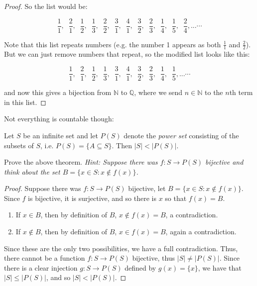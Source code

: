 \documentclass[11pt,dvipsnames]{book}
\numberwithin{equation}{section} %
\numberwithin{figure}{section} %
\numberwithin{table}{section} %
\begin{document}
\begin{proof}
So the list would be:

\[
\frac{1}{1}, \;\; \frac{2}{1}, \;\; \frac{1}{2}, \;\; \frac{1}{3}, \;\; \frac{2}{2}, \;\; \frac{3}{1}, \;\; \frac{4}{1}, \;\; \frac{3}{2}, \;\; \frac{2}{3}, \;\; \frac{1}{4}, \;\; \frac{1}{5}, \;\; \frac{2}{4},...\cdots \]

Note that this list repeats numbers (e.g. the number 1 appears as both $\frac{1}{1}$ and $\frac{2}{2}$). But we can just remove numbers that repeat, so the modified list looks like this:

\[
\frac{1}{1}, \;\; \frac{2}{1}, \;\; \frac{1}{2}, \;\; \frac{1}{3},  \;\; \frac{3}{1}, \;\; \frac{4}{1}, \;\; \frac{3}{2}, \;\; \frac{2}{3}, \;\; \frac{1}{4}, \;\; \frac{1}{5},...\cdots \]

and now this gives a bijection from $\mathbb{N}$ to $\mathbb{Q}$, where we send $n\in\mathbb{N}$ to the $n$th term in this list. 

\end{proof}

Not everything is countable though:

\begin{theorem}
Let $S$ be an infinite set and let $P(S)$ denote the {\it power set} consisting of the subsets of $S$, i.e. $P(S)= \{A\subseteq S\}$. Then $|S|<|P(S)|$. 
\end{theorem}

\begin{exercise}
Prove the above theorem. {\it Hint: Suppose there was $f:S\rightarrow P(S)$ bijective and think about the set $B=\{x\in S: x\not\in f(x)\}$.}
\end{exercise}

\begin{solution}
\begin{proof}
Suppose there was $f:S\rightarrow P(S)$ bijective, let $B=\{x\in S: x\not\in f(x)\}$. Since $f$ is bijective, it is surjective, and so there is $x$ so that $f(x)=B$. 
\begin{enumerate}
\item If $x\in B$, then by definition of $B$, $x\not\in f(x)=B$, a contradiction.
\item If $x\not\in B$, then by definition of $B$, $x\in f(x)=B$, again a contradiction.
\end{enumerate}
Since these are the only two possibilities, we have a full contradiction. Thus, there cannot be a function $f:S\rightarrow P(S)$ bijective, thus $|S|\neq |P(S)|$. Since there is a clear injection $g:S\rightarrow P(S)$ defined by $g(x)=\{x\}$, we have that $|S|\leq |P(S)|$, and so $|S|<|P(S)|$. 
\end{proof}
\end{solution}
\end{document}

